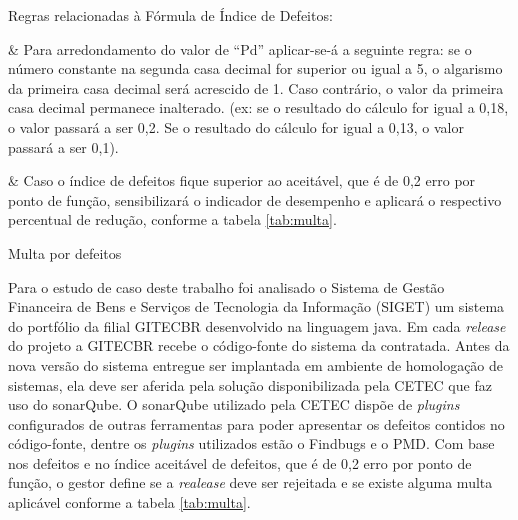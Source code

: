 \begin{table}[!ht]
	\begin{center}


\begin{easylist}[itemize]

\begin{flushleft}
Regras relacionadas à Fórmula de Índice de Defeitos:\linebreak[1] 
\end{flushleft}


& Para arredondamento do valor de “Pd” aplicar-se-á a seguinte regra: se o número constante na segunda casa decimal for superior ou igual a 5, o algarismo da primeira casa decimal será acrescido de 1. Caso contrário, o valor da primeira casa decimal permanece inalterado. (ex: se o resultado do cálculo for igual a 0,18, o valor passará a ser 0,2. Se o resultado do cálculo for igual a 0,13, o valor passará a ser 0,1).

& Caso o índice de defeitos fique superior ao aceitável, que é de 0,2 erro por ponto de função, sensibilizará o indicador de desempenho e aplicará o respectivo percentual de redução, conforme a tabela \ref{tab:multa}.\linebreak[1]  
 
\end{easylist}
	
	 
	\caption{Multa por defeitos}
	\label{tab:multa}
	\end{center}
	\end{table}	
	\FloatBarrier
	
	
Para o estudo de caso deste trabalho foi analisado o Sistema de Gestão Financeira de Bens e Serviços de Tecnologia da Informação (SIGET) um sistema do portfólio da filial GITECBR desenvolvido na linguagem java. Em cada \textit{release} do projeto a GITECBR recebe o código-fonte do sistema da contratada. Antes da nova versão do sistema entregue ser implantada em ambiente de homologação de sistemas, ela deve ser aferida pela solução disponibilizada pela CETEC que faz uso do sonarQube. O sonarQube utilizado pela CETEC dispõe de \textit{plugins} configurados de outras ferramentas  para poder apresentar os defeitos contidos no código-fonte, dentre os \textit{plugins} utilizados estão o Findbugs e o PMD. Com base nos defeitos e no índice aceitável de defeitos, que é de 0,2 erro por ponto de função, o gestor define se a \textit{realease} deve ser rejeitada e se existe alguma multa aplicável conforme a tabela \ref{tab:multa}.


